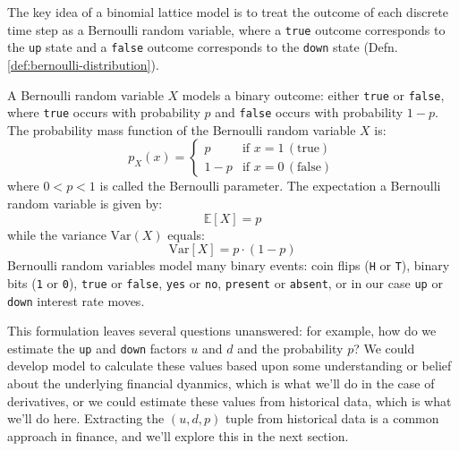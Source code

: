 \documentclass[11pt]{article}
\theoremstyle{definition}
\begin{document}
The key idea of a binomial lattice model is to treat the outcome of each discrete time step as a Bernoulli random variable, 
where a \texttt{true} outcome corresponds to the \texttt{up} state and a \texttt{false} outcome corresponds to the \texttt{down} state (Defn. \ref{def:bernoulli-distribution}).
\begin{definition}\label{def:bernoulli-distribution}
A Bernoulli random variable $X$ models a binary outcome: either \texttt{true} or \texttt{false}, 
where \texttt{true} occurs with probability $p$ and \texttt{false} occurs with probability $1-p$. 
The probability mass function of the Bernoulli random variable $X$ is:	
\begin{equation}
p_{X}(x) = \begin{cases}
	p & \text{if } x = 1\,(\text{true}) \\
	1 - p & \text{if } x = 0\,(\text{false})
	\end{cases}
\end{equation}
where $0<p<1$ is called the Bernoulli parameter. The expectation a Bernoulli random variable is given by:
\begin{equation}
	\mathbb{E}\left[X\right] = p
\end{equation}
while the variance $\text{Var}(X)$ equals:
\begin{equation}
\text{Var}\left[X\right] = p\cdot(1-p)
\end{equation}
Bernoulli random variables model many binary events: coin flips (\texttt{H} or \texttt{T}), 
binary bits (\texttt{1} or \texttt{0}), \texttt{true} or \texttt{false}, \texttt{yes} or \texttt{no}, \texttt{present} or \texttt{absent}, 
or in our case \texttt{up} or \texttt{down} interest rate moves.
\end{definition}
This formulation leaves several questions unanswered: for example, how do we estimate the \texttt{up} and \texttt{down} factors $u$ and $d$ and the probability $p$?
We could develop model to calculate these values based upon some understanding or belief about the underlying financial dyanmics, 
which is what we'll do in the case of derivatives, or we could estimate these values from historical data, which is what we'll do here.
Extracting the $(u,d,p)$ tuple from historical data is a common approach in finance, and we'll explore this in the next section. 
\end{document}
